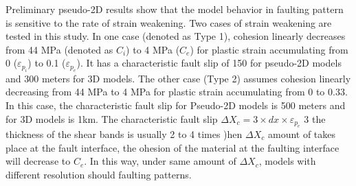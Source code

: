 Preliminary pseudo-2D results show that the model behavior in faulting pattern is sensitive to the rate of strain weakening. Two cases of strain weakening are tested in this study. In one case (denoted as Type 1), cohesion linearly decreases from 44 MPa (denoted as $C_{i}$) to 4 MPa ($C_{e}$) for plastic strain accumulating from 0 ($\varepsilon_{p_{i}}$) to 0.1 ($\varepsilon_{p_{e}}$). It has a characteristic fault slip of 150  for pseudo-2D models and 300 meters for 3D models. The other case (Type 2) assumes cohesion linearly decreasing from 44 MPa to 4 MPa for plastic strain accumulating from 0 to 0.33. In this case, the characteristic fault slip for Pseudo-2D models is 500 meters and for 3D models is 1km.
The characteristic fault slip  $\Delta X_{c}=3 \times dx \times \varepsilon_{p_{e}}$   3  the thickness of the shear bands  is usually 2 to 4 times   \citep{Lavier2000})hen $\Delta X_{c}$ amount of  takes place at the fault interface, the ohesion of the material at the faulting interface will decrease to $C_{e}$. In this way, under  same amount of $\Delta X_{c}$, models with different resolution should  faulting patterns. 

